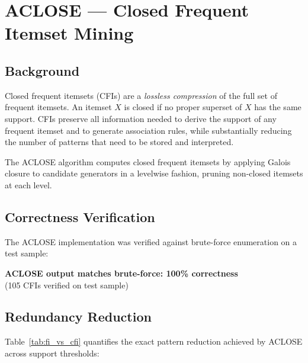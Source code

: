 \documentclass[12pt,a4paper]{article}
\begin{document}
\section{ACLOSE --- Closed Frequent Itemset Mining}

\subsection{Background}

Closed frequent itemsets (CFIs) are a \emph{lossless compression} of the full set of frequent itemsets. An itemset $X$ is closed if no proper superset of $X$ has the same support. CFIs preserve all information needed to derive the support of any frequent itemset and to generate association rules, while substantially reducing the number of patterns that need to be stored and interpreted.

The ACLOSE algorithm computes closed frequent itemsets by applying Galois closure to candidate generators in a levelwise fashion, pruning non-closed itemsets at each level.

\subsection{Correctness Verification}

The ACLOSE implementation was verified against brute-force enumeration on a test sample:

\begin{bestbox}
\begin{center}
\textbf{ACLOSE output matches brute-force: 100\% correctness}\\
(105 CFIs verified on test sample)
\end{center}
\end{bestbox}

\subsection{Redundancy Reduction}

Table~\ref{tab:fi_vs_cfi} quantifies the exact pattern reduction achieved by ACLOSE across support thresholds:
\end{document}
